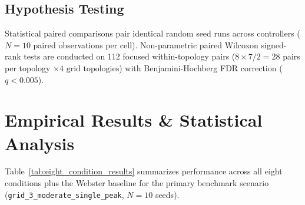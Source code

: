 \documentclass[3p,times,procedia]{elsarticle}
\begin{document}
\subsection{Hypothesis Testing}
Statistical paired comparisons pair identical random seed runs across controllers ($N=10$ paired observations per cell). Non-parametric paired Wilcoxon signed-rank tests are conducted on 112 focused within-topology pairs ($8 \times 7 / 2 = 28$ pairs per topology $\times 4 \text{ grid topologies}$) with Benjamini-Hochberg FDR correction ($q < 0.005$).


\section{Empirical Results \& Statistical Analysis}
\label{sec:results}

Table~\ref{tab:eight_condition_results} summarizes performance across all eight conditions plus the Webster baseline for the primary benchmark scenario (\texttt{grid\_3\_moderate\_single\_peak}, $N=10$ seeds).
\end{document}
